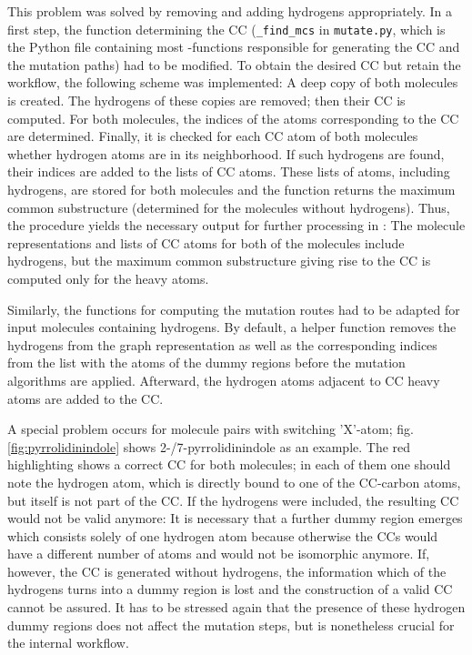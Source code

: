 This problem was solved by removing and adding hydrogens appropriately.
In a first step, the {\trafo} function determining the CC (\texttt{\_find\_mcs} in \texttt{mutate.py}, which is the Python file containing most {\trafo}-functions responsible for generating the CC and the mutation paths) had to be modified. 
To obtain the desired CC but retain the {\trafo} workflow, the following scheme was implemented:
A deep copy of both molecules is created. The hydrogens of these copies are removed; then their CC is computed. For both molecules, the indices of the atoms corresponding to the CC are determined. Finally, it is checked for each CC atom of both molecules whether hydrogen atoms are in its neighborhood. If such hydrogens are found, their indices are added to the lists of CC atoms. These lists of atoms, including hydrogens, are stored for both molecules and the function returns the maximum common substructure (determined for the molecules without hydrogens).
Thus, the procedure yields the necessary output for further processing in {\trafo}: The molecule representations and lists of CC atoms for both of the molecules include hydrogens, but the maximum common substructure giving rise to the CC is computed only for the heavy atoms.

Similarly, the functions for computing the mutation routes had to be adapted for input molecules containing hydrogens. By default, a helper function removes the hydrogens from the graph representation as well as the corresponding indices from the list with the atoms of the dummy regions before the mutation algorithms are applied. Afterward, the hydrogen atoms adjacent to CC heavy atoms are added to the CC.

A special problem occurs for molecule pairs with switching 'X'-atom; fig. \ref{fig:pyrrolidinindole} shows 2-/7-pyrrolidinindole as an example. The red highlighting shows a correct CC for both molecules; in each of them one should note the hydrogen atom, which is directly bound to one of the CC-carbon atoms, but itself is not part of the CC. If the hydrogens were included, the resulting CC would not be valid anymore: It is necessary that a further dummy region emerges which consists solely of one hydrogen atom because otherwise the CCs would have a different number of atoms and would not be isomorphic anymore. If, however, the CC is generated without hydrogens, the information which of the hydrogens turns into a dummy region is lost and the construction of a valid CC cannot be assured.
It has to be stressed again that the presence of these hydrogen dummy regions does not affect the mutation steps, but is nonetheless crucial for the internal {\trafo} workflow. 

